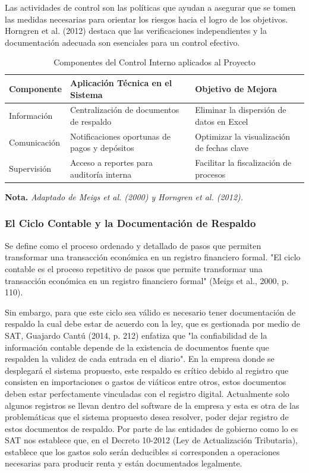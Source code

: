 Las actividades de control son las políticas que ayudan a asegurar que se tomen las medidas necesarias para orientar los riesgos hacia el logro de los objetivos. Horngren et al. (2012) destaca que las verificaciones independientes y la documentación adecuada son esenciales para un control efectivo.

\begin{table}[h]
    \centering
    \caption{Componentes del Control Interno aplicados al Proyecto}
    \vspace{0.2cm}
    \begin{tabular}{p{3cm} p{5cm} p{5cm}}
        \toprule
        \textbf{Componente} & \textbf{Aplicación Técnica en el Sistema} & \textbf{Objetivo de Mejora} \\
        \midrule
        Información & Centralización de documentos de respaldo & Eliminar la dispersión de datos en Excel \\
        Comunicación & Notificaciones oportunas de pagos y depósitos & Optimizar la visualización de fechas clave \\
        Supervisión & Acceso a reportes para auditoría interna & Facilitar la fiscalización de procesos \\
        \bottomrule
    \end{tabular}
    
    \vspace{0.2cm}
    \raggedright \small \textbf{Nota.} \textit{Adaptado de Meigs et al. (2000) y Horngren et al. (2012).}
\end{table}

\subsubsection{El Ciclo Contable y la Documentación de Respaldo}

Se define como el proceso ordenado y detallado de pasos que permiten transformar una transacción económica en un registro financiero formal. "El ciclo contable es el proceso repetitivo de pasos que permite transformar una transacción económica en un registro financiero formal" (Meigs et al., 2000, p. 110).

Sin embargo, para que este ciclo sea válido es necesario tener documentación de respaldo la cual debe estar de acuerdo con la ley, que es gestionada por medio de SAT, Guajardo Cantú (2014, p. 212) enfatiza que "la confiabilidad de la información contable depende de la existencia de documentos fuente que respalden la validez de cada entrada en el diario". En la empresa donde se desplegará el sistema propuesto, este respaldo es crítico debido al registro que consisten en importaciones o gastos de viáticos entre otros, estos documentos deben estar perfectamente vinculadas con el registro digital. Actualmente solo algunos registros se llevan dentro del software de la empresa y esta es otra de las problemáticas que el sistema propuesto desea resolver, poder dejar registro de estos documentos de respaldo. Por parte de las entidades de gobierno como lo es SAT nos establece que, en el {Decreto 10-2012 (Ley de Actualización Tributaria)}, establece que los gastos solo serán deducibles si corresponden a operaciones necesarias para producir renta y están documentados legalmente.

